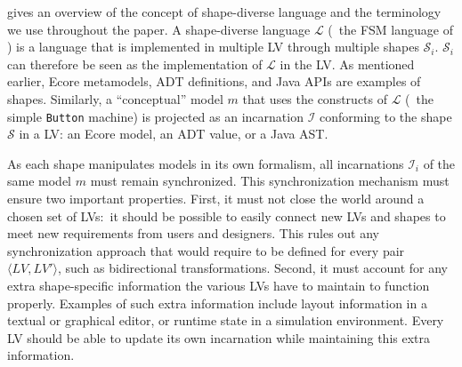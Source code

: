  gives an overview of the concept of shape-diverse language and the terminology we use throughout the paper.
A shape-diverse language $\mathcal{L}$ (\eg~the FSM language of ) is a language that is implemented in multiple LV through multiple shapes $\mathcal{S}_i$.
$\mathcal{S}_i$ can therefore be seen as the implementation of $\mathcal{L}$ in the LV.
As mentioned earlier, Ecore metamodels, ADT definitions, and Java APIs are examples of shapes.
Similarly, a ``conceptual'' model $m$ that uses the constructs of $\mathcal{L}$ (\eg~the simple {\footnotesize \texttt{Button}} machine) is projected as an incarnation $\mathcal{I}$ conforming to the shape $\mathcal{S}$ in a LV: an Ecore model, an ADT value, or a Java AST.


As each shape manipulates models in its own formalism, all incarnations $\mathcal{I}_i$ of the same model $m$ must remain synchronized.
This synchronization mechanism must ensure two important properties.
First, it must not close the world around a chosen set of LVs:~it should be possible to easily connect new LVs and shapes to meet new requirements from users and designers.
This rules out any synchronization approach that would require to be defined for every pair $\langle LV, LV' \rangle$, such as bidirectional transformations. 
Second, it must account for any extra shape-specific information the various LVs have to maintain to function properly.
Examples of such extra information include layout information in a textual or graphical editor, or runtime state in a simulation environment.
Every LV should be able to update its own incarnation while maintaining this extra information.
